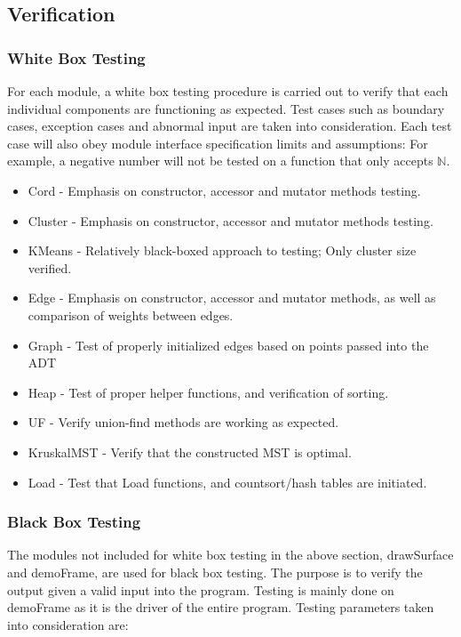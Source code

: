 \documentclass[12pt]{article}
\begin{document}
\subsection{Verification}
\subsubsection{White Box Testing}
For each module, a white box testing procedure is carried out to verify that each
individual components are functioning as expected. Test cases such as boundary 
cases, exception cases and abnormal input are taken into consideration. Each test
case will also obey module interface specification limits and assumptions: For example,
a negative number will not be tested on a function that only accepts $\mathbb{N}$.

\begin{itemize}
\item Cord - Emphasis on constructor, accessor and mutator methods testing.
\item Cluster - Emphasis on constructor, accessor and mutator methods testing.
\item KMeans - Relatively black-boxed approach to testing; Only cluster size verified.
\item Edge - Emphasis on constructor, accessor and mutator methods, as well as comparison
of weights between edges.
\item Graph - Test of properly initialized edges based on points passed into the ADT
\item Heap - Test of proper helper functions, and verification of sorting.
\item UF - Verify union-find  methods are working as expected.
\item KruskalMST - Verify that the constructed MST is optimal.
\item Load - Test that Load functions, and countsort/hash tables are initiated.
\end{itemize}

\newpage

\subsubsection{Black Box Testing}
The modules not included for white box testing in the above section, drawSurface and demoFrame,
are used for black box testing. The purpose is to verify the output given a valid input into
the program. Testing is mainly done on demoFrame as it is the driver of the entire program.
Testing parameters taken into consideration are:
\end{document}

